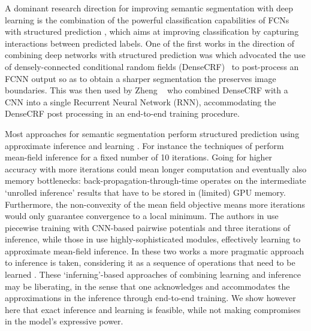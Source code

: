 \documentclass[runningheads]{llncs}
\begin{document}
A dominant research direction for improving semantic segmentation with deep learning is the combination of the powerful classification capabilities of FCNs with structured prediction  \cite{crfrnn,Vemulapalli_2016_CVPR,deeplab1,schwing,vemulapalli,IonescuVS15}, 
which aims at improving classification by capturing interactions between  predicted labels. 
One of the first works in the direction of combining deep networks with structured prediction was \cite{deeplab1} which advocated the use of densely-connected conditional random fields (DenseCRF)~\cite{densecrf} to post-process an FCNN output so as to obtain a sharper segmentation the preserves image boundaries. This was then used by Zheng \etal~\cite{crfrnn} who combined DenseCRF with a CNN
into a single Recurrent Neural Network (RNN), accommodating the DenseCRF post processing in an end-to-end training procedure. 


Most approaches for semantic segmentation perform structured prediction using approximate inference and learning \cite{schwing,couprie2012multi}.
For instance the techniques of \cite{crfrnn,Vemulapalli_2016_CVPR,deeplab1,vemulapalli} perform mean-field inference for a fixed number of 10 iterations.
Going for higher accuracy with more iterations 
could mean longer computation and eventually also memory bottlenecks:  back-propagation-through-time operates on  the intermediate `unrolled inference' results that have to be stored in  (limited) GPU memory. Furthermore, the non-convexity of the mean field objective means more iterations would only guarantee  convergence to a local minimum. 
The authors in \cite{Adelaide} use piecewise training with CNN-based pairwise potentials and three iterations of inference, while those in \cite{DPN} use highly-sophisticated modules, effectively learning to approximate mean-field inference. 
In  these two works a more pragmatic approach to inference is taken, considering it as a sequence of operations that need to be learned \cite{crfrnn}. 
These `inferning'-based approaches of combining learning and inference may be liberating, in the sense that one acknowledges and accommodates the approximations in the inference through end-to-end training. We show however here that exact inference and learning is feasible, while not making compromises in the model's expressive power. 
\end{document}
